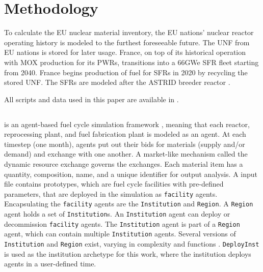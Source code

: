 
\section{Methodology}



To calculate the \gls{EU} nuclear material inventory,
the \gls{EU} nations' nuclear reactor operating
history is modeled to the furthest foreseeable future.
The \gls{UNF} from \gls{EU} nations is stored for later usage.
France, on top of its historical operation with \gls{MOX} production
for its \glspl{PWR}, transitions into a 66GWe \gls{SFR} fleet
starting from 2040. France begins production of fuel for \glspl{SFR}
in 2020 by recycling the stored \gls{UNF}.
The \glspl{SFR} are modeled after the \gls{ASTRID} breeder reactor \cite{varaine_pre-conceptual_2012}.


All scripts and data used
in this paper are available in \cite{bae_arfc/transition-scenarios:_2017}.


\subsection{\Cyclus}

\Cyclus is an agent-based fuel cycle simulation framework \cite{huff_fundamental_2016}, meaning that
each reactor, reprocessing plant, and fuel fabrication plant is modeled as an agent.
At each timestep (one month),
agents put out their bids for materials (supply and/or demand) and exchange
with one another. A market-like mechanism called the dynamic resource exchange
\cite{gidden_agent-based_2015} governs the exchanges.
Each material item has a quantity, composition, name, and a unique identifier
for output analysis. 
A \Cyclus input file contains prototypes, which are fuel cycle facilities with
pre-defined parameters, that are deployed in the simulation as \texttt{facility} agents.
Encapsulating the \texttt{facility} agents are the \texttt{Institution} and \texttt{Region}.
A \texttt{Region} agent holds a set of \texttt{Institution}s. 
An \texttt{Institution} agent can deploy or decommission \texttt{facility} agents.
The \texttt{Institution} agent is part of a \texttt{Region} agent,
which can contain multiple \texttt{Institution} agents. Several versions of \texttt{Institution}
and \texttt{Region} exist, varying in complexity and functions \cite{huff_extensions_2014}.
 \texttt{DeployInst} is used as the institution archetype for this work, where the institution
deploys agents in a user-defined time. 

